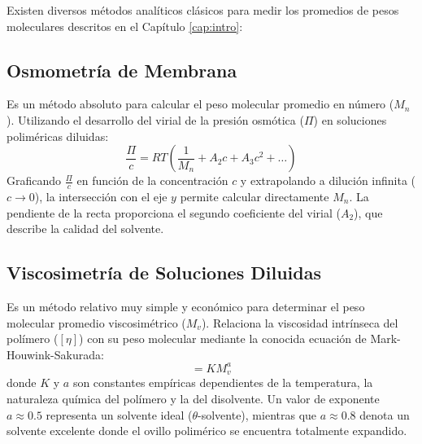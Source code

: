 Existen diversos métodos analíticos clásicos para medir los promedios de pesos moleculares descritos en el Capítulo \ref{cap:intro}:

\subsection{Osmometría de Membrana}
Es un método absoluto para calcular el peso molecular promedio en número ($M_n$). Utilizando el desarrollo del virial de la presión osmótica ($\Pi$) en soluciones poliméricas diluidas:
\begin{equation}
    \frac{\Pi}{c} = R T \left( \frac{1}{M_n} + A_2 c + A_3 c^2 + \dots \right)
    \label{eq:osmometria}
\end{equation}
Graficando $\frac{\Pi}{c}$ en función de la concentración $c$ y extrapolando a dilución infinita ($c \to 0$), la intersección con el eje $y$ permite calcular directamente $M_n$. La pendiente de la recta proporciona el segundo coeficiente del virial ($A_2$), que describe la calidad del solvente.

\subsection{Viscosimetría de Soluciones Diluidas}
Es un método relativo muy simple y económico para determinar el peso molecular promedio viscosimétrico ($M_v$). Relaciona la viscosidad intrínseca del polímero ($[\eta]$) con su peso molecular mediante la conocida ecuación de Mark-Houwink-Sakurada:
\begin{equation}
    [\eta] = K M_v^a
    \label{eq:mark_houwink}
\end{equation}
donde $K$ y $a$ son constantes empíricas dependientes de la temperatura, la naturaleza química del polímero y la del disolvente. Un valor de exponente $a \approx 0.5$ representa un solvente ideal ($\theta$-solvente), mientras que $a \approx 0.8$ denota un solvente excelente donde el ovillo polimérico se encuentra totalmente expandido.
